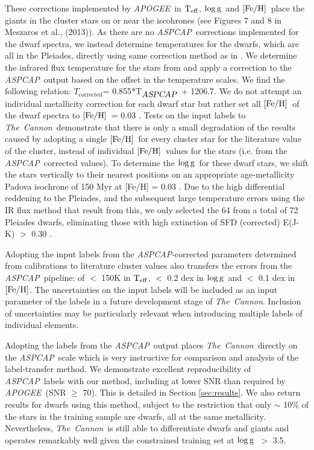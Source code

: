 \documentclass[12pt, preprint]{aastex}
\newcommand{\teff}{\mbox{$\rm T_{eff}$}}
\newcommand{\feh}{\mbox{$\rm [Fe/H]$}}
\newcommand{\logg}{\mbox{$\rm \log g$}}
\newcommand{\tc}{\textsl{The~Cannon}}
\newcommand{\apogee}{\textsl{APOGEE}}
\newcommand{\aspcap}{\textsl{ASPCAP}}
\begin{document}
These corrections implemented by \apogee\ in \teff, \logg\ and  \feh\ place the giants in the cluster stars on or near the iscohrones (see Figures 7 and 8 in Meszaros et al., (2013)).  As there are no \aspcap\ corrections implemented for the dwarf spectra, we instead determine temperatures for the dwarfs, which are all in the Pleiades, directly using same correction method as in \citet{Meszaros2013}. We determine the infrared flux temperature for the stars from \citet{Gonzalez2009} and apply a correction to the \aspcap\ output based on the offset in the temperature scales. We find the following relation: $T_{\mbox{corrected}}$= 0.855*T$_{\mbox{\textit{\aspcap}}}$ + 1206.7. We do not attempt an individual metallicity correction for each dwarf star but rather set all \feh\ of the dwarf spectra to \feh\ = 0.03 \citep{Barrado2001}. Tests on the input labels to \tc\ demonstrate that there is only a small degradation of the results caused by adopting a single \feh\ for every cluster star for the literature value of the cluster, instead of individual \feh\ values for the stars (i.e. from the \aspcap\ corrected values). To determine the \logg\ for these dwarf stars, we shift the stars vertically to their nearest positions on an appropriate age-metallicity Padova isochrone of 150 Myr at [Fe/H] = 0.03 \citep{girardi2000}. Due to the high differential reddening to the Pleiades, and the subsequent large temperature errors using the IR flux method that result from this, we only selected the 64 from a total of 72 Pleiades dwarfs, eliminating those with high extinction of SFD (corrected) E(J-K) $>$ 0.30 \citep{Schlafly2011}.

Adopting the input labels from the \aspcap-corrected parameters determined from calibrations to literature cluster values also transfers the errors from the \aspcap\ pipeline: of $<$ 150K in \teff,  $<$ 0.2 dex in \logg\ and $<$ 0.1 dex in \feh.   The uncertainties on the input labels will be included as an input parameter of the labels in a future development stage of \tc. Inclusion of uncertainties may be particularly relevant when introducing multiple labels of individual elements. 

Adopting the labels from the \aspcap\ output places \tc\ directly on the \aspcap\ scale which is very instructive for comparison and analysis of the label-transfer method. We demonstrate excellent reproducibility of \aspcap\ labels with our method, including at lower SNR than required by \apogee\ (SNR $\ge$ 70). This is detailed in Section \ref{sec:results}. We also return results for dwarfs using this method, subject to the restriction that only $\sim$ 10\% of the stars in the training sample are dwarfs, all at the same metallicity. Nevertheless, \tc\ is still able to differentiate dwarfs and giants and operates remarkably well given the constrained training set at \logg\ $>$ 3.5. 
\end{document}
